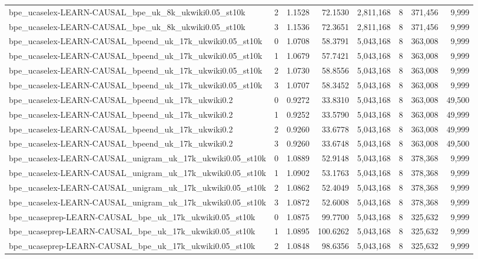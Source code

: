 \begin{tabular}{lrrrrrrr}
bpe\_ucaselex-LEARN-CAUSAL\_bpe\_uk\_8k\_ukwiki0.05\_st10k & 2 & 1.1528 & 72.1530 & 2,811,168 & 8 & 371,456 & 9,999 \\
bpe\_ucaselex-LEARN-CAUSAL\_bpe\_uk\_8k\_ukwiki0.05\_st10k & 3 & 1.1536 & 72.3651 & 2,811,168 & 8 & 371,456 & 9,999 \\
bpe\_ucaselex-LEARN-CAUSAL\_bpeend\_uk\_17k\_ukwiki0.05\_st10k & 0 & 1.0708 & 58.3791 & 5,043,168 & 8 & 363,008 & 9,999 \\
bpe\_ucaselex-LEARN-CAUSAL\_bpeend\_uk\_17k\_ukwiki0.05\_st10k & 1 & 1.0679 & 57.7421 & 5,043,168 & 8 & 363,008 & 9,999 \\
bpe\_ucaselex-LEARN-CAUSAL\_bpeend\_uk\_17k\_ukwiki0.05\_st10k & 2 & 1.0730 & 58.8556 & 5,043,168 & 8 & 363,008 & 9,999 \\
bpe\_ucaselex-LEARN-CAUSAL\_bpeend\_uk\_17k\_ukwiki0.05\_st10k & 3 & 1.0707 & 58.3452 & 5,043,168 & 8 & 363,008 & 9,999 \\
bpe\_ucaselex-LEARN-CAUSAL\_bpeend\_uk\_17k\_ukwiki0.2 & 0 & 0.9272 & 33.8310 & 5,043,168 & 8 & 363,008 & 49,500 \\
bpe\_ucaselex-LEARN-CAUSAL\_bpeend\_uk\_17k\_ukwiki0.2 & 1 & 0.9252 & 33.5790 & 5,043,168 & 8 & 363,008 & 49,999 \\
bpe\_ucaselex-LEARN-CAUSAL\_bpeend\_uk\_17k\_ukwiki0.2 & 2 & 0.9260 & 33.6778 & 5,043,168 & 8 & 363,008 & 49,999 \\
bpe\_ucaselex-LEARN-CAUSAL\_bpeend\_uk\_17k\_ukwiki0.2 & 3 & 0.9260 & 33.6748 & 5,043,168 & 8 & 363,008 & 49,500 \\
bpe\_ucaselex-LEARN-CAUSAL\_unigram\_uk\_17k\_ukwiki0.05\_st10k & 0 & 1.0889 & 52.9148 & 5,043,168 & 8 & 378,368 & 9,999 \\
bpe\_ucaselex-LEARN-CAUSAL\_unigram\_uk\_17k\_ukwiki0.05\_st10k & 1 & 1.0902 & 53.1763 & 5,043,168 & 8 & 378,368 & 9,999 \\
bpe\_ucaselex-LEARN-CAUSAL\_unigram\_uk\_17k\_ukwiki0.05\_st10k & 2 & 1.0862 & 52.4049 & 5,043,168 & 8 & 378,368 & 9,999 \\
bpe\_ucaselex-LEARN-CAUSAL\_unigram\_uk\_17k\_ukwiki0.05\_st10k & 3 & 1.0872 & 52.6008 & 5,043,168 & 8 & 378,368 & 9,999 \\
bpe\_ucaseprep-LEARN-CAUSAL\_bpe\_uk\_17k\_ukwiki0.05\_st10k & 0 & 1.0875 & 99.7700 & 5,043,168 & 8 & 325,632 & 9,999 \\
bpe\_ucaseprep-LEARN-CAUSAL\_bpe\_uk\_17k\_ukwiki0.05\_st10k & 1 & 1.0895 & 100.6262 & 5,043,168 & 8 & 325,632 & 9,999 \\
bpe\_ucaseprep-LEARN-CAUSAL\_bpe\_uk\_17k\_ukwiki0.05\_st10k & 2 & 1.0848 & 98.6356 & 5,043,168 & 8 & 325,632 & 9,999 \\

\end{tabular}
